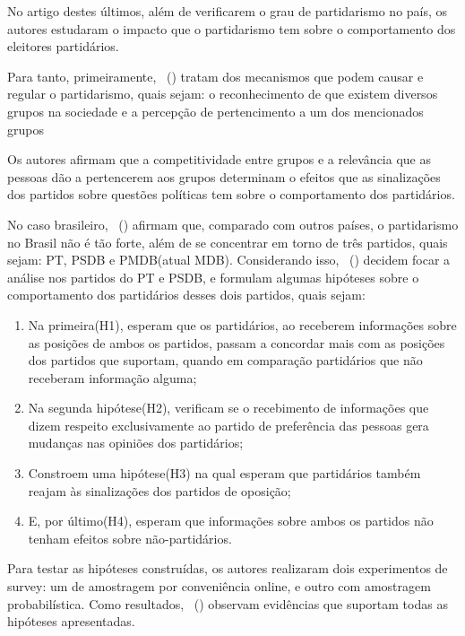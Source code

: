 \documentclass[
	12pt,				%
	openright,			%
	twoside,			%
	a4paper,			%
	openany,
	english,			%
	brazil				%
	]{abntex2}
\begin{document}
No artigo destes últimos\cite{Samuels2014Jan}, além de verificarem o grau de partidarismo no país, os autores estudaram o impacto que o partidarismo tem sobre o comportamento dos eleitores partidários.

Para tanto, primeiramente, ~(\citeyear{Samuels2014Jan}) tratam dos mecanismos que podem causar e regular o partidarismo, quais sejam: o reconhecimento de que existem diversos grupos na sociedade e a percepção de pertencimento a um dos mencionados grupos

 Os autores\cite{Samuels2014Jan} afirmam que a competitividade entre grupos e a relevância que as pessoas dão a pertencerem aos grupos determinam o efeitos que as sinalizações dos partidos sobre questões políticas tem sobre o comportamento dos partidários.

No caso brasileiro, ~(\citeyear{Samuels2014Jan}) afirmam que, comparado com outros países, o partidarismo no Brasil não é tão forte, além de se concentrar em torno de três partidos, quais sejam: PT, PSDB e PMDB(atual MDB). Considerando isso, ~(\citeyear{Samuels2014Jan}) decidem focar a análise nos partidos do PT e PSDB, e formulam algumas hipóteses sobre o comportamento dos partidários desses dois partidos, quais sejam:

\begin{enumerate}

\item Na primeira(H1), esperam que os partidários, ao receberem informações sobre as posições de ambos os partidos, passam a concordar mais com as posições dos partidos que suportam, quando em comparação partidários que não receberam informação alguma;

\item Na segunda hipótese(H2), verificam se o recebimento de informações que dizem respeito exclusivamente ao partido de preferência das pessoas gera mudanças nas opiniões dos partidários;

\item Constroem uma hipótese(H3) na qual esperam que partidários também reajam às sinalizações dos partidos de oposição;

\item E, por último(H4), esperam que informações sobre ambos os partidos não tenham efeitos sobre não-partidários.

\end{enumerate}

Para testar as hipóteses construídas, os autores\cite{Samuels2014Jan} realizaram dois experimentos de survey: um de amostragem por conveniência online, e outro com amostragem probabilística. Como resultados, ~(\citeyear{Samuels2014Jan}) observam evidências que suportam todas as hipóteses apresentadas.
\end{document}
